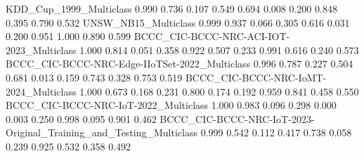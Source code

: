 KDD_Cup_1999_Multiclass                                                    0.990            0.736                                    0.107                           0.549           0.694                    0.008                                                     0.200                                     0.848                                     0.395                              0.790   0.532
UNSW_NB15_Multiclass                                                       0.999            0.937                                    0.066                           0.305           0.616                    0.031                                                     0.200                                     0.951                                     1.000                              0.890   0.599
BCCC_CIC-BCCC-NRC-ACI-IOT-2023_Multiclass                                  1.000            0.814                                    0.051                           0.358           0.922                    0.507                                                     0.233                                     0.991                                     0.616                              0.240   0.573
BCCC_CIC-BCCC-NRC-Edge-IIoTSet-2022_Multiclass                             0.996            0.787                                    0.227                           0.504           0.681                    0.013                                                     0.159                                     0.743                                     0.328                              0.753   0.519
BCCC_CIC-BCCC-NRC-IoMT-2024_Multiclass                                     1.000            0.673                                    0.168                           0.231           0.800                    0.174                                                     0.192                                     0.959                                     0.841                              0.458   0.550
BCCC_CIC-BCCC-NRC-IoT-2022_Multiclass                                      1.000            0.983                                    0.096                           0.298           0.000                    0.003                                                     0.250                                     0.998                                     0.095                              0.901   0.462
BCCC_CIC-BCCC-NRC-IoT-2023-Original_Training_and_Testing_Multiclass        0.999            0.542                                    0.112                           0.417           0.738                    0.058                                                     0.239                                     0.925                                     0.532                              0.358   0.492
